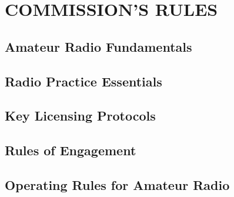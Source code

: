 \documentclass[12pt]{book}
\begin{document}
\tableofcontents
\newpage
\chapter{COMMISSION’S RULES }
\section{Amateur Radio Fundamentals}











\section{Radio Practice Essentials}












\section{Key Licensing Protocols}











\section{Rules of Engagement}











\section{Operating Rules for Amateur Radio}











\end{document}
